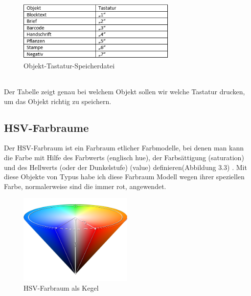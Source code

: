 \documentclass[10pt,a4paper]{report}
\begin{document}
\begin{figure}[htbp] 
	\centering
	\includegraphics[width=0.7\textwidth]{Tabelle.png}
	\caption{Objekt-Tastatur-Speicherdatei}
	\label{fig:Tabelle 1}
\end{figure}\\
Der Tabelle zeigt genau bei welchem Objekt sollen wir welche Tastatur drucken, um das Objekt richtig zu speichern.

\subsection{HSV-Farbraume}
Der HSV-Farbraum ist ein Farbraum etlicher Farbmodelle, bei denen man kann die Farbe mit Hilfe des Farbwerts (englisch hue), der Farbsättigung (saturation) und des Hellwerts (oder der Dunkelstufe) (value) definieren(Abbildung 3.3) \cite{7}. Mit diese Objekte von Typus habe ich diese Farbraum Modell wegen ihrer speziellen Farbe, normalerweise sind die immer rot, angewendet. 
\begin{figure}[htbp] 
	\centering
	\includegraphics[width=0.5\textwidth]{HSV_cone.png}
	\caption{HSV-Farbraum als Kegel}
	\label{fig:Bild 3}
\end{figure}
\end{document}
